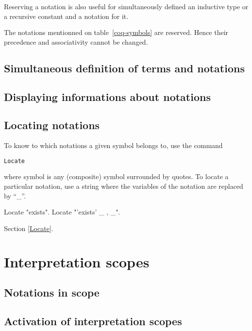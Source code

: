 Reserving a notation is also useful for simultaneously defined an
inductive type or a recursive constant and a notation for it.

\Rem The notations mentionned on table~\ref{coq-symbols} are
reserved. Hence their precedence and associativity cannot be changed.

\subsection{Simultaneous definition of terms and notations}

\subsection{Displaying informations about notations}


\subsection{Locating notations}
\label{LocateSymbol}

To know to which notations a given symbol belongs to, use the command

\bigskip
{\tt Locate {\symbolentry}}
\bigskip

where symbol is any (composite) symbol surrounded by quotes. To locate
a particular notation, use a string where the variables of the
notation are replaced by ``\_''.

\Example

\begin{coq_example}
Locate "exists".
Locate "'exists' _ , _".
\end{coq_example}

\SeeAlso Section \ref{Locate}.

\section{Interpretation scopes}
\label{scopes}

\subsection{Notations in scope}

\subsection{Activation of interpretation scopes}

